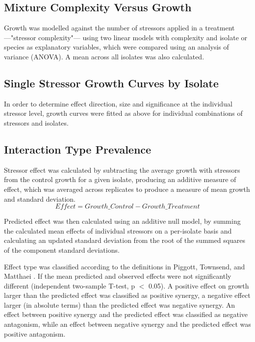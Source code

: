 \documentclass[review,12pt]{elsarticle}
\begin{document}
\subsection{Mixture Complexity Versus Growth}
\label{S:2:7}
Growth was modelled against the number of stressors applied in a treatment ---"stressor complexity"--- using two linear models with complexity and isolate or species as explanatory variables, which were compared using an analysis of variance (ANOVA). A mean across all isolates was also calculated. 

\subsection{Single Stressor Growth Curves by Isolate}
\label{S:2:8}
In order to determine effect direction, size and significance at the individual stressor level, growth curves were fitted as above for individual combinations of stressors and isolates. 

\subsection{Interaction Type Prevalence}
\label{S:2:9}
Stressor effect was calculated by subtracting the average growth with stressors from the control growth for a given isolate, producing an additive measure of effect, which was averaged across replicates to produce a measure of mean growth and standard deviation.
\begin{equation}
Effect = Growth\_{Control} - Growth\_{Treatment}
\label{E:effect_calc}
\end{equation}

Predicted effect was then calculated using an additive null model, by summing the calculated mean effects of individual stressors on a per-isolate basis and calculating an updated standard deviation from the root of the summed squares of the component standard deviations. 

Effect type was classified according to the definitions in Piggott, Townsend, and Matthaei \cite{Piggott2015}. If the mean predicted and observed effects were not significantly different (independent two-sample T-test, p $<$ 0.05). A positive effect on growth larger than the predicted effect was classified as positive synergy, a negative effect larger (in absolute terms) than the predicted effect was negative synergy. An effect between positive synergy and the predicted effect was classified as negative antagonism, while an effect between negative synergy and the predicted effect was positive antagonism. 
\end{document}

